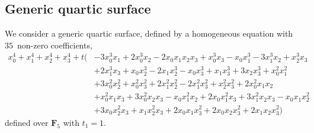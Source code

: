 \documentclass[a4paper,11pt]{article}
\numberwithin{equation}{section}
\theoremstyle{definition}
\begin{document}
\begin{comment} The computation of the connection matrix is near instantaneous 
again, although in this case this is largely due to the sparseness 
of multivariate polynomial defining the family.  The Frobenius 
matrix for the fibre at $t = 0$ is determined in $0.02$~seconds 
($45.26$~minutes).  The local solutions $C(t)$ and $C(t)^{-1}$ 
require $0.27$ and $0.08$ seconds, which together with the 
computation local expansion of Frobenius in $0.15$ seconds 
yields $0.5$~seconds ($19.9$~minutes).  The analytic continuation, 
evaluation at the Teichm\"uller lift of $t_1$  and construction 
of the $q$th-power Frobenius take $0.02$, $0.04$ and $0.62$ seconds, 
respectively, adding up to $0.68$~seconds ($18.66$~minutes).  The 
root-unitary polynomial that we find is given by 
\begin{align*}
3^{20} p\bigl(3^{-20} T\bigr) & = 
  -3486784401 T^{21} - 39675197243 T^{20} - 191506614866 T^{19} \\
& \quad - 482588946510 T^{18} - 552821487569 T^{17} + 243001138765 T^{16} \\
& \quad + 1641410078472 T^{15} + 1793016627512 T^{14} - 410199003010 T^{13} \\
& \quad - 2617001208822 T^{12} - 1586643774924 T^{11} + 1586643774924 T^{10} \\
& \quad + 2617001208822 T^9 + 410199003010 T^8 - 1793016627512 T^7 \\
& \quad - 1641410078472 T^6 - 243001138765 T^5 + 552821487569 T^4 \\
& \quad + 482588946510 T^3 + 191506614866 T^2 + 39675197243 T + 3486784401.
\end{align*}

\end{comment}

\subsection{Generic quartic surface}

We consider a generic quartic surface, defined by a homogeneous equation 
with $35$~non-zero coefficients,
\begin{equation*}
\begin{split}
x_0^4 + x_1^4 + x_2^4 + x_3^4 
+ t \bigl( & -3 x_0^3 x_1 + 2 x_0^3 x_2 - 2 x_0 x_1 x_2 x_3 + x_0^3 x_3 - x_0 x_1^3 - 3 x_1^3 x_2 + x_2^3 x_3 \\ &
          + 2 x_1^3 x_3 + x_0 x_2^3 - 2 x_1 x_2^3 - x_0 x_3^3 + x_1 x_3^3 + 3 x_2 x_3^3 + x_0^2 x_1^2 \\ & 
          + 3 x_0^2 x_2^2 + x_0^2 x_3^2 + 2 x_1^2 x_2^2 - 2 x_1^2 x_3^2 + x_2^2 x_3^2 
          + 2 x_0^2 x_1 x_2 \\ & + x_0^2 x_1 x_3 + 3 x_0^2 x_2 x_3 - x_0 x_1^2 x_2 + 2 x_0 x_1^2 x_3 
          + 3 x_1^2 x_2 x_3 - x_0 x_1 x_2^2 \\ & 
          + 3 x_0 x_2^2 x_3 + x_1 x_2^2 x_3 + 2 x_0 x_1 x_3^2 + 2 x_0 x_2 x_3^2 + 2 x_1 x_2 x_3^2 \bigr)
\end{split}
\end{equation*}
defined over $\mathbf{F}_5$ with $t_1 = 1$.
\end{document}
